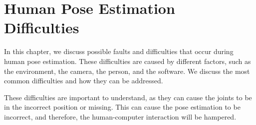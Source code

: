 \chapter{Human Pose Estimation Difficulties}
\label{sec:errors}

In this chapter, we discuss possible faults and difficulties that occur during human pose estimation. These difficulties are caused by different factors, such as the environment, the camera, the person, and the software. We discuss the most common difficulties and how they can be addressed. 

These difficulties are important to understand, as they can cause the joints to be in the incorrect position or missing. This can cause the pose estimation to be incorrect, and therefore, the human-computer interaction will be hampered.



